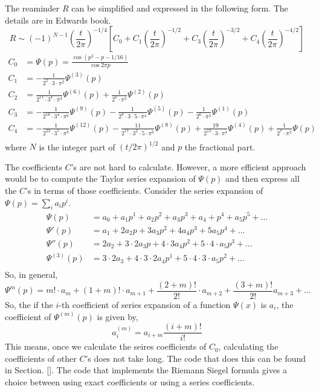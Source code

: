 \documentclass{amsproc}
\newcommand{\be}{\begin{equation}}
\newcommand{\ee}{\end{equation}}
\theoremstyle{definition}
\theoremstyle{remark}
\numberwithin{equation}{section}
\begin{document}
The reaminder $R$ can be simplified and expressed in the following form. The details are in Edwards book.
\be
R \sim (-1)^{N - 1} \left( \frac{t}{2 \pi} \right)^{-1/4} \left[ C_0 + C_1 \left( \frac{t}{2\pi} \right)^{-1/2} + C_3 \left( \frac{t}{2\pi} \right)^{-3/2} + C_4 \left( \frac{t}{2\pi} \right)^{-4/2}\right]
\ee
\begin{align*}
 C_0 &= \Psi(p) = \frac{ \cos{\left( p^2 - p - 1/16 \right)} }{\cos{2 \pi p}} \\
 C_1 &= - \frac{1}{2^5 \cdot 3 \cdot \pi^2} \Psi^{(3)}(p) \\
 C_2 &=  \frac{1}{2^{11} \cdot 3^4 \cdot \pi^4} \Psi^{(6)}(p) + \frac{1}{2^6 \cdot \pi^2} \Psi^{(2)}(p)\\
 C_3 &=  - \frac{1}{2^{16} \cdot 3^4 \cdot \pi^6} \Psi^{(9)}(p) - \frac{1}{2^8 \cdot 3 \cdot 5 \cdot \pi^4} \Psi^{(5)}(p) - \frac{1}{2^6 \cdot \pi^2} \Psi^{(1)}(p) \\
 C_4 &=  - \frac{1}{2^{23} \cdot 3^5 \cdot \pi^8} \Psi^{(12)}(p) - \frac{11}{2^17 \cdot 3^2 \cdot 5 \cdot \pi^6} \Psi^{(8)}(p) + \frac{19}{2^{13} \cdot 3 \cdot \pi^4} \Psi^{(4)}(p) + \frac{1}{2^{7} \cdot \pi^2} \Psi(p) \\
\end{align*}
where $N$ is the integer part of $(t/2\pi)^{1/2}$ and $p$ the fractional part. 

The coefficients $C$'s are not hard to calculate. However, a more efficient approach would be to compute the Taylor series expansion of $\Psi(p)$ and then express all the $C$'s in terms of those coefficients. Consider the series expansion of $\Psi(p) = \sum_i a_i p^i$. 
\begin{align*}
\Psi(p) &= a_0 + a_1 p^1 + a_2 p^2 + a_3 p^3 + a_4 + p^4 + a_5 p^5 + \ldots \\
\Psi'(p) &= a_1 + 2 a_2 p + 3 a_3 p^2 + 4 a_4 p^3 + 5 a_5 p^4 + \ldots \\
\Psi''(p) &= 2 a_2 + 3\cdot2 a_3 p + 4 \cdot 3 a_4 p^2 + 5 \cdot4 \cdot a_5 p^3 + \ldots \\
\Psi^{(3)}(p) &= 3\cdot2 a_3 + 4 \cdot 3 \cdot 2 a_4 p^1 + 5 \cdot 4 \cdot 3 \cdot a_5 p^2 + \ldots \\
\end{align*}
So, in general,
\begin{equation*}
 \Psi^{m}(p) = m! \cdot a_m + (1 + m)! \cdot a_{m + 1} + \frac{(2 + m)!}{2!} \cdot a_{m + 2} + \frac{(3 + m)!}{2!} a_{m + 3} + \ldots
\end{equation*}
So, the if the $i$-th coefficient of series expansion of a function $\Psi(x)$ is $a_i$, the coefficient of $\Psi^{(m)}(p)$ is given by, 
\begin{equation*}
 a^{(m)}_i = a_{i + m} \frac{ (i + m)! }{ i! }
\end{equation*}
This means, once we calculate the seires coefficients of $C_0$, calculating the coefficients of other $C$'s does not take long. The code that does this can be found in Section. \ref{}. The code that implements the Riemann Siegel formula gives a choice between using exact coefficients or using a series coefficients. 
\end{document}
